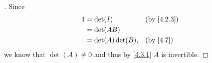 \begin{proof}[]
  Since
  \begin{align*}
    1 & = \det(I)          &  & \text{(by \cref{4.2.3})} \\
      & = \det(AB)                                       \\
      & = \det(A) \det(B), &  & \text{(by \cref{4.7})}
  \end{align*}
  we know that \(\det(A) \neq 0\) and thus by \cref{4.3.1} \(A\) is invertible.
\end{proof}

\begin{ex}\label{ex:4.3.18}

\end{ex}
